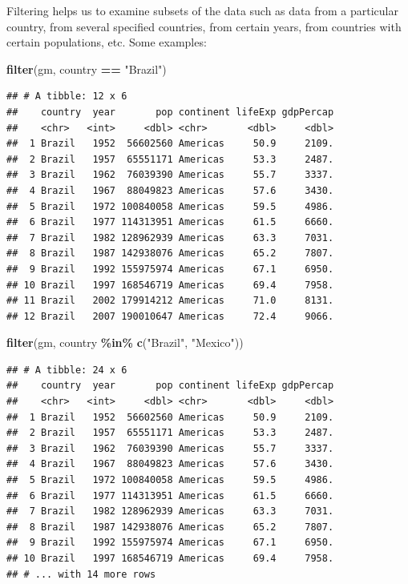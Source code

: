 \documentclass[
]{krantz}
\newenvironment{Shaded}{\begin{snugshade}}{\end{snugshade}}
\newcommand{\KeywordTok}[1]{\textcolor[rgb]{0.13,0.29,0.53}{\textbf{#1}}}
\newcommand{\NormalTok}[1]{#1}
\newcommand{\OperatorTok}[1]{\textcolor[rgb]{0.81,0.36,0.00}{\textbf{#1}}}
\newcommand{\StringTok}[1]{\textcolor[rgb]{0.31,0.60,0.02}{#1}}
\begin{document}
Filtering helps us to examine subsets of the data such as data from a particular country, from several specified countries, from certain years, from countries with certain populations, etc. Some examples:

\begin{Shaded}
\begin{Highlighting}[]
\KeywordTok{filter}\NormalTok{(gm, country }\OperatorTok{==}\StringTok{ "Brazil"}\NormalTok{)}
\end{Highlighting}
\end{Shaded}

\begin{verbatim}
## # A tibble: 12 x 6
##    country  year       pop continent lifeExp gdpPercap
##    <chr>   <int>     <dbl> <chr>       <dbl>     <dbl>
##  1 Brazil   1952  56602560 Americas     50.9     2109.
##  2 Brazil   1957  65551171 Americas     53.3     2487.
##  3 Brazil   1962  76039390 Americas     55.7     3337.
##  4 Brazil   1967  88049823 Americas     57.6     3430.
##  5 Brazil   1972 100840058 Americas     59.5     4986.
##  6 Brazil   1977 114313951 Americas     61.5     6660.
##  7 Brazil   1982 128962939 Americas     63.3     7031.
##  8 Brazil   1987 142938076 Americas     65.2     7807.
##  9 Brazil   1992 155975974 Americas     67.1     6950.
## 10 Brazil   1997 168546719 Americas     69.4     7958.
## 11 Brazil   2002 179914212 Americas     71.0     8131.
## 12 Brazil   2007 190010647 Americas     72.4     9066.
\end{verbatim}

\begin{Shaded}
\begin{Highlighting}[]
\KeywordTok{filter}\NormalTok{(gm, country }\OperatorTok{\%in\%}\StringTok{ }\KeywordTok{c}\NormalTok{(}\StringTok{"Brazil"}\NormalTok{, }\StringTok{"Mexico"}\NormalTok{))}
\end{Highlighting}
\end{Shaded}

\begin{verbatim}
## # A tibble: 24 x 6
##    country  year       pop continent lifeExp gdpPercap
##    <chr>   <int>     <dbl> <chr>       <dbl>     <dbl>
##  1 Brazil   1952  56602560 Americas     50.9     2109.
##  2 Brazil   1957  65551171 Americas     53.3     2487.
##  3 Brazil   1962  76039390 Americas     55.7     3337.
##  4 Brazil   1967  88049823 Americas     57.6     3430.
##  5 Brazil   1972 100840058 Americas     59.5     4986.
##  6 Brazil   1977 114313951 Americas     61.5     6660.
##  7 Brazil   1982 128962939 Americas     63.3     7031.
##  8 Brazil   1987 142938076 Americas     65.2     7807.
##  9 Brazil   1992 155975974 Americas     67.1     6950.
## 10 Brazil   1997 168546719 Americas     69.4     7958.
## # ... with 14 more rows
\end{verbatim}
\end{document}
